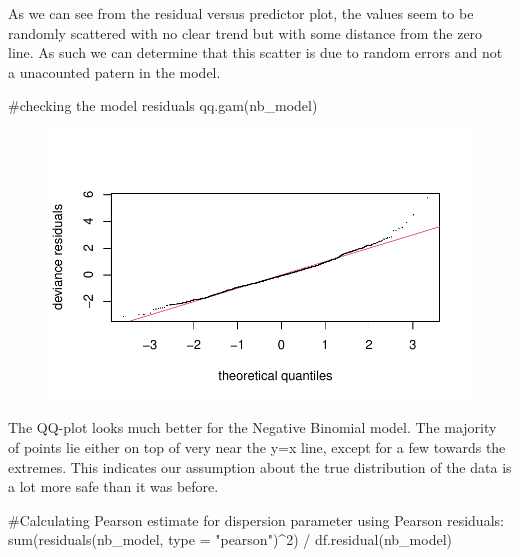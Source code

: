 \documentclass[
  letterpaper,
  DIV=11,
  numbers=noendperiod]{scrartcl}
\newenvironment{Shaded}{\begin{snugshade}}{\end{snugshade}}
\newcommand{\AttributeTok}[1]{\textcolor[rgb]{0.40,0.45,0.13}{#1}}
\newcommand{\CommentTok}[1]{\textcolor[rgb]{0.37,0.37,0.37}{#1}}
\newcommand{\DecValTok}[1]{\textcolor[rgb]{0.68,0.00,0.00}{#1}}
\newcommand{\FunctionTok}[1]{\textcolor[rgb]{0.28,0.35,0.67}{#1}}
\newcommand{\NormalTok}[1]{\textcolor[rgb]{0.00,0.23,0.31}{#1}}
\newcommand{\SpecialCharTok}[1]{\textcolor[rgb]{0.37,0.37,0.37}{#1}}
\newcommand{\StringTok}[1]{\textcolor[rgb]{0.13,0.47,0.30}{#1}}
\begin{document}
As we can see from the residual versus predictor plot, the values seem
to be randomly scattered with no clear trend but with some distance from
the zero line. As such we can determine that this scatter is due to
random errors and not a unacounted patern in the model.

\begin{Shaded}
\begin{Highlighting}[]
\CommentTok{\#checking the model residuals}
\FunctionTok{qq.gam}\NormalTok{(nb\_model)}
\end{Highlighting}
\end{Shaded}

\begin{figure}[H]

{\centering \includegraphics{Group34Coursework_files/figure-pdf/unnamed-chunk-14-1.pdf}

}

\end{figure}

The QQ-plot looks much better for the Negative Binomial model. The
majority of points lie either on top of very near the y=x line, except
for a few towards the extremes. This indicates our assumption about the
true distribution of the data is a lot more safe than it was before.

\begin{Shaded}
\begin{Highlighting}[]
\CommentTok{\#Calculating Pearson estimate for dispersion parameter using Pearson residuals:}
\FunctionTok{sum}\NormalTok{(}\FunctionTok{residuals}\NormalTok{(nb\_model, }\AttributeTok{type =} \StringTok{"pearson"}\NormalTok{)}\SpecialCharTok{\^{}}\DecValTok{2}\NormalTok{) }\SpecialCharTok{/} \FunctionTok{df.residual}\NormalTok{(nb\_model)}
\end{Highlighting}
\end{Shaded}
\end{document}
